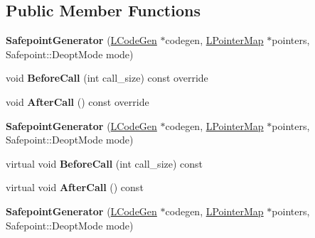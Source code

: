 \subsection*{Public Member Functions}
\begin{DoxyCompactItemize}
\item 
{\bfseries Safepoint\+Generator} (\hyperlink{classv8_1_1internal_1_1_l_code_gen}{L\+Code\+Gen} $\ast$codegen, \hyperlink{classv8_1_1internal_1_1_l_pointer_map}{L\+Pointer\+Map} $\ast$pointers, Safepoint\+::\+Deopt\+Mode mode)\hypertarget{classv8_1_1internal_1_1_safepoint_generator_a7a81102e43adaf0a004c32f46d708577}{}\label{classv8_1_1internal_1_1_safepoint_generator_a7a81102e43adaf0a004c32f46d708577}

\item 
void {\bfseries Before\+Call} (int call\+\_\+size) const  override\hypertarget{classv8_1_1internal_1_1_safepoint_generator_a7b03e6da476c179ce443391b5bd938c3}{}\label{classv8_1_1internal_1_1_safepoint_generator_a7b03e6da476c179ce443391b5bd938c3}

\item 
void {\bfseries After\+Call} () const  override\hypertarget{classv8_1_1internal_1_1_safepoint_generator_a32145b74058d317a4b7a01e894c17df8}{}\label{classv8_1_1internal_1_1_safepoint_generator_a32145b74058d317a4b7a01e894c17df8}

\item 
{\bfseries Safepoint\+Generator} (\hyperlink{classv8_1_1internal_1_1_l_code_gen}{L\+Code\+Gen} $\ast$codegen, \hyperlink{classv8_1_1internal_1_1_l_pointer_map}{L\+Pointer\+Map} $\ast$pointers, Safepoint\+::\+Deopt\+Mode mode)\hypertarget{classv8_1_1internal_1_1_safepoint_generator_a7a81102e43adaf0a004c32f46d708577}{}\label{classv8_1_1internal_1_1_safepoint_generator_a7a81102e43adaf0a004c32f46d708577}

\item 
virtual void {\bfseries Before\+Call} (int call\+\_\+size) const \hypertarget{classv8_1_1internal_1_1_safepoint_generator_ad2b3390d459df3f8845e6cd94fc9e4f9}{}\label{classv8_1_1internal_1_1_safepoint_generator_ad2b3390d459df3f8845e6cd94fc9e4f9}

\item 
virtual void {\bfseries After\+Call} () const \hypertarget{classv8_1_1internal_1_1_safepoint_generator_a4bc6a194f5f18ad1707a4f66516482ff}{}\label{classv8_1_1internal_1_1_safepoint_generator_a4bc6a194f5f18ad1707a4f66516482ff}

\item 
{\bfseries Safepoint\+Generator} (\hyperlink{classv8_1_1internal_1_1_l_code_gen}{L\+Code\+Gen} $\ast$codegen, \hyperlink{classv8_1_1internal_1_1_l_pointer_map}{L\+Pointer\+Map} $\ast$pointers, Safepoint\+::\+Deopt\+Mode mode)\hypertarget{classv8_1_1internal_1_1_safepoint_generator_a7a81102e43adaf0a004c32f46d708577}{}\label{classv8_1_1internal_1_1_safepoint_generator_a7a81102e43adaf0a004c32f46d708577}


\end{DoxyCompactItemize}
